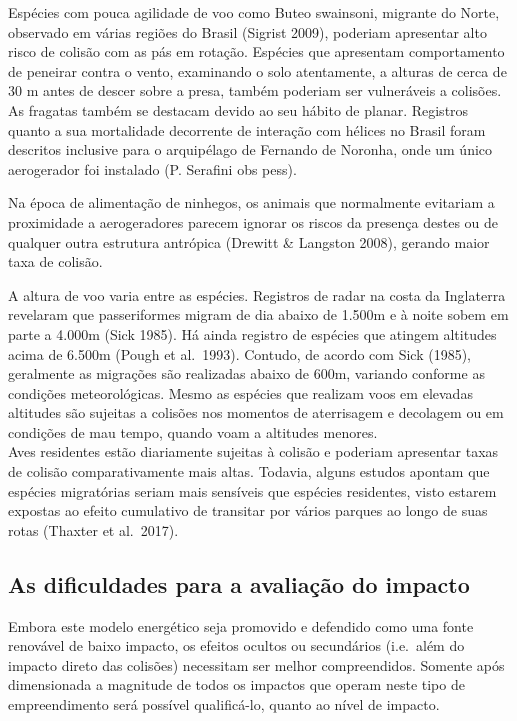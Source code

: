\documentclass[
  oneside]{scrbook}
\begin{document}
Espécies com pouca agilidade de voo como Buteo swainsoni, migrante do Norte, observado em várias regiões do Brasil (Sigrist 2009), poderiam apresentar alto risco de colisão com as pás em rotação. Espécies que apresentam comportamento de peneirar contra o vento, examinando o solo atentamente, a alturas de cerca de 30 m antes de descer sobre a presa, também poderiam ser vulneráveis a colisões. As fragatas também se destacam devido ao seu hábito de planar. Registros quanto a sua mortalidade decorrente de interação com hélices no Brasil foram descritos inclusive para o arquipélago de Fernando de Noronha, onde um único aerogerador foi instalado (P. Serafini obs pess).

Na época de alimentação de ninhegos, os animais que normalmente evitariam a proximidade a aerogeradores parecem ignorar os riscos da presença destes ou de qualquer outra estrutura antrópica (Drewitt \& Langston 2008), gerando maior taxa de colisão.

A altura de voo varia entre as espécies. Registros de radar na costa da Inglaterra revelaram que passeriformes migram de dia abaixo de 1.500m e à noite sobem em parte a 4.000m (Sick 1985). Há ainda registro de espécies que atingem altitudes acima de 6.500m (Pough et al.~1993). Contudo, de acordo com Sick (1985), geralmente as migrações são realizadas abaixo de 600m, variando conforme as condições meteorológicas. Mesmo as espécies que realizam voos em elevadas altitudes são sujeitas a colisões nos momentos de aterrisagem e decolagem ou em condições de mau tempo, quando voam a altitudes menores.\\
Aves residentes estão diariamente sujeitas à colisão e poderiam apresentar taxas de colisão comparativamente mais altas. Todavia, alguns estudos apontam que espécies migratórias seriam mais sensíveis que espécies residentes, visto estarem expostas ao efeito cumulativo de transitar por vários parques ao longo de suas rotas (Thaxter et al.~2017).

\hypertarget{as-dificuldades-para-a-avaliauxe7uxe3o-do-impacto}{%
\subsection{As dificuldades para a avaliação do impacto}\label{as-dificuldades-para-a-avaliauxe7uxe3o-do-impacto}}

Embora este modelo energético seja promovido e defendido como uma fonte renovável de baixo impacto, os efeitos ocultos ou secundários (i.e.~além do impacto direto das colisões) necessitam ser melhor compreendidos. Somente após dimensionada a magnitude de todos os impactos que operam neste tipo de empreendimento será possível qualificá-lo, quanto ao nível de impacto.
\end{document}
